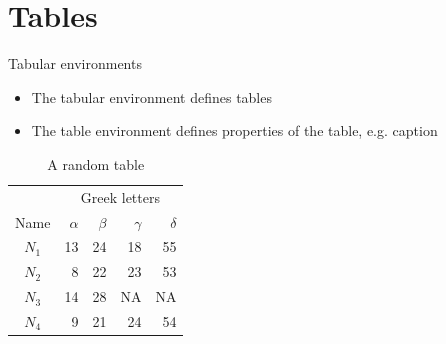 \documentclass[12pt, aspectratio=169, xcolor=pdftex]{beamer}
\begin{document}
\section{Tables}
\begin{frame}{Tabular environments}
\begin{itemize}
\item{The tabular environment defines tables}
\item{The table environment defines properties of the table, e.g.
caption}
\end{itemize}


\begin{table}[h] %
\begin{tabular}{c | r | r | r| r} %
 &  \multicolumn{4}{c}{Greek letters}\\
Name & $\alpha$ & $\beta$ & $\gamma$ & $\delta$ \\
\hline \hline
$N_1$ & 13 & 24 & 18 & 55 \\
$N_2$ & 8 & 22 & 23 & 53 \\
$N_3$ & 14 & 28 & NA & NA \\
$N_4$ & 9 & 21 & 24 & 54 \\
\hline \hline
\end{tabular}
\caption{A random table}
\end{table}



\end{frame}
\end{document}
